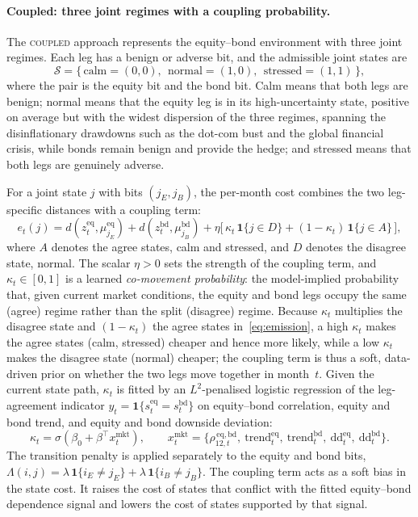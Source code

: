 \documentclass[10pt]{article}
\newcommand{\zeq}{z^{\mathrm{eq}}_t}
\newcommand{\zbd}{z^{\mathrm{bd}}_t}
\newcommand{\Reg}{\mathcal{S}}
\newcommand{\Acoup}{\textsc{coupled}}
\begin{document}
\paragraph{Coupled: three joint regimes with a coupling probability.}
The \Acoup{} approach represents the equity--bond environment with three joint regimes. Each
leg has a benign or adverse bit, and the admissible joint states are
\[
    \Reg=\{\,\text{calm}=(0,0),\ \ \text{normal}=(1,0),\ \ \text{stressed}=(1,1)\,\},
\]
where the pair is the equity bit and the bond bit. Calm means that both legs are benign; normal means that the equity leg is in its high-uncertainty state, positive on average but with the widest dispersion of the three regimes, spanning the disinflationary drawdowns such as the dot-com bust and the global financial crisis, while bonds remain benign and provide the hedge; and stressed means that both legs are genuinely adverse.

For a joint state $j$ with bits $(j_E,j_B)$, the per-month cost combines the two leg-specific
distances with a coupling term:
\begin{equation}{}
    e_t(j)=d\!\left(\zeq,\mu^{\mathrm{eq}}_{j_E}\right)+d\!\left(\zbd,\mu^{\mathrm{bd}}_{j_B}\right)
    +\eta\Big[\,\kappa_t\,\mathbf{1}\{j\in D\}+(1-\kappa_t)\,\mathbf{1}\{j\in A\}\,\Big],
    \label{eq:emission}
\end{equation}
where $A$ denotes the agree states, calm and stressed, and $D$ denotes the disagree state,
normal.
The scalar $\eta>0$ sets the strength of the coupling term, and $\kappa_t\in[0,1]$ is a learned
\emph{co-movement probability}: the model-implied probability that, given current market
conditions, the equity and bond legs occupy the same (agree) regime rather than the split
(disagree) regime. Because $\kappa_t$ multiplies the disagree state and $(1-\kappa_t)$ the agree
states in~\eqref{eq:emission}, a high $\kappa_t$ makes the agree states (calm, stressed) cheaper
and hence more likely, while a low $\kappa_t$ makes the disagree state (normal) cheaper; the
coupling term is thus a soft, data-driven prior on whether the two legs move together in
month~$t$.
Given the current state path, $\kappa_t$ is fitted by an
$L^2$-penalised logistic regression of the leg-agreement indicator
$y_t=\mathbf{1}\{s^{\mathrm{eq}}_t=s^{\mathrm{bd}}_t\}$ on equity--bond correlation, equity
and bond trend, and equity and bond downside deviation:
\begin{equation}
    \kappa_t=\sigma\!\left(\beta_0+\beta^{\top}x^{\mathrm{mkt}}_t\right),\qquad
    x^{\mathrm{mkt}}_t=\big\{\rho^{\,\mathrm{eq,bd}}_{12,t},\ \mathrm{trend}^{\mathrm{eq}}_t,\
    \mathrm{trend}^{\mathrm{bd}}_t,\ \mathrm{dd}^{\mathrm{eq}}_t,\ \mathrm{dd}^{\mathrm{bd}}_t\big\}.
    \label{eq:kappa}
\end{equation}
The transition penalty is applied separately to the equity and bond bits,
$\Lambda(i,j)=\lambda\,\mathbf{1}\{i_E\neq j_E\}+\lambda\,\mathbf{1}\{i_B\neq j_B\}$.
The coupling term acts as a soft bias in the state cost. It raises the cost of states that
conflict with the fitted equity--bond dependence signal and lowers the cost of states
supported by that signal.
\end{document}
